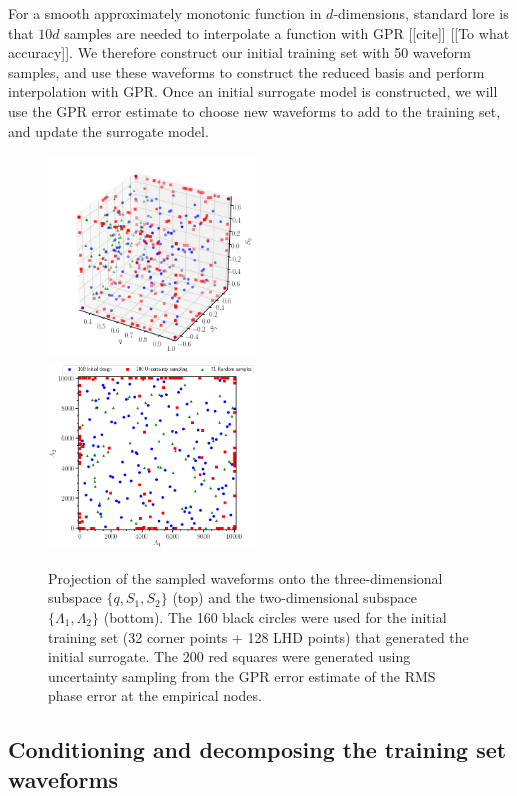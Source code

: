 \documentclass[prd,aps,letter,twocolumn,floatfix,notitlepage,nofootinbib]{revtex4-1}
\begin{document}
For a smooth approximately monotonic function in $d$-dimensions, standard lore is that $10d$ samples are needed to interpolate 
a function with GPR [[cite]] [[To what accuracy]]. We therefore construct our initial training set with 50 waveform samples, and use 
these waveforms to construct the reduced basis and perform interpolation with GPR. Once an initial surrogate model is constructed,
we will use the GPR error estimate to choose new waveforms to add to the training set, and update the surrogate model.

\begin{figure}[htb]
\centering
\includegraphics[width=0.49\textwidth]{trainingset3d.png}\\
\includegraphics[width=0.49\textwidth]{trainingset2d.png}
\caption{Projection of the sampled waveforms onto the three-dimensional subspace $\{q, S_1, S_2\}$ (top)
and the two-dimensional subspace $\{\Lambda_1, \Lambda_2\}$ (bottom). The 160 black circles were used for the initial
training set (32 corner points + 128 LHD points) that generated the initial surrogate. The 200 red squares were generated
using uncertainty sampling from the GPR error estimate of the RMS phase error at the empirical nodes. 
}
\label{fig:LHD}
\end{figure}

\subsection{Conditioning and decomposing the training set waveforms}
\end{document}
